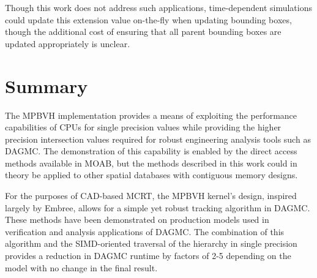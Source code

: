 Though this work does not address such applications, time-dependent simulations
could update this extension value on-the-fly when updating bounding boxes,
though the additional cost of ensuring that all parent bounding boxes are
updated appropriately is unclear.

\section{Summary}

The MPBVH implementation provides a means of exploiting the performance
capabilities of CPUs for single precision values while providing the higher
precision intersection values required for robust engineering analysis tools
such as DAGMC. The demonstration of this capability is enabled by the direct
access methods available in MOAB, but the methods described in this work could
in theory be applied to other spatial databases with contiguous memory designs.

For the purposes of CAD-based MCRT, the MPBVH kernel's design, inspired largely
by Embree, allows for a simple yet robust tracking algorithm in DAGMC. These
methods have been demonstrated on production models used in verification and
analysis applications of DAGMC. The combination of this algorithm and the
SIMD-oriented traversal of the hierarchy in single precision provides a
reduction in DAGMC runtime by factors of 2-5 depending on the model with no
change in the final result.
